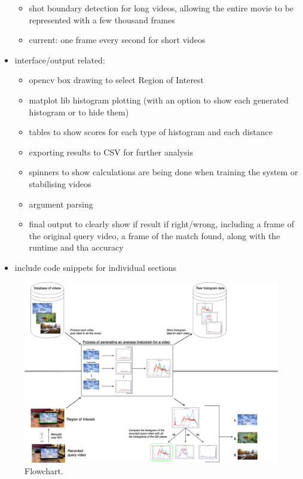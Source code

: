 \begin{itemize}
\begin{itemize}
            \item shot boundary detection for long videos, allowing the entire movie to be represented with a few thousand frames
            \item current: one frame every second for short videos
        \end{itemize}
    \item interface/output related: 
    \begin{itemize}
        \item opencv box drawing to select Region of Interest
        \item matplot lib histogram plotting (with an option to show each generated histogram or to hide them)
        \item tables to show scores for each type of histogram and each distance
        \item exporting results to CSV for further analysis
        \item spinners to show calculations are being done when training the system or stabilising videos 
        \item argument parsing
        \item final output to clearly show if result if right/wrong, including a frame of the original query video, a frame of the match found, along with the runtime and tha accuracy
    \end{itemize}
    \item include code snippets for individual sections
\end{itemize}

\begin{figure}[h] 
\centerline{\includegraphics[width=\textwidth]{figures/implementation/CBVR-flowchart.png}}
\caption{\label{fig:CBVR flowchart}Flowchart.}
\end{figure}